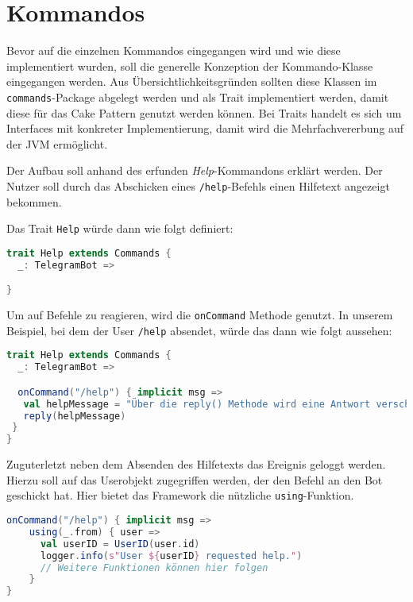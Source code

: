 \section{Kommandos}
Bevor auf die einzelnen Kommandos eingegangen wird und wie diese implementiert wurden, soll die generelle Konzeption der Kommando-Klasse eingegangen werden. Aus Übersichtlichkeitsgründen sollten diese Klassen im \texttt{commands}-Package abgelegt werden und als Trait implementiert werden, damit diese für das Cake Pattern genutzt werden können. Bei Traits handelt es sich um Interfaces mit konkreter Implementierung, damit wird die Mehrfachvererbung auf der JVM ermöglicht.

Der Aufbau soll anhand des erfunden \emph{Help}-Kommandons erklärt werden. Der Nutzer soll durch das Abschicken eines \texttt{/help}-Befehls einen Hilfetext angezeigt bekommen.

Das Trait \texttt{Help} würde dann wie folgt definiert:

\begin{lstlisting}[language=scala,style=scala,caption=Grundstruktur eines eigenen Kommandos]
trait Help extends Commands {
  _: TelegramBot =>

}
\end{lstlisting}

Um auf Befehle zu reagieren, wird die \texttt{onCommand} Methode genutzt. In unserem Beispiel, bei dem der User \texttt{/help} absendet, würde das dann wie folgt aussehen:

\begin{lstlisting}[language=scala, style=scala, caption=Reaktion auf den help-Befehl]
trait Help extends Commands {
  _: TelegramBot =>

  onCommand("/help") { implicit msg =>
   val helpMessage = "Über die reply() Methode wird eine Antwort verschickt."
   reply(helpMessage)
 }
}
\end{lstlisting}

Zuguterletzt neben dem Absenden des Hilfetexts das Ereignis geloggt werden. Hierzu soll auf das Userobjekt zugegriffen werden, der den Befehl an den Bot geschickt hat. Hier bietet das Framework die nützliche \texttt{using}-Funktion.

\begin{lstlisting}[language=scala, style=scala, caption=Zugriff auf das User Objekt]
onCommand("/help") { implicit msg =>
    using(_.from) { user =>
      val userID = UserID(user.id)
      logger.info(s"User ${userID} requested help.")
      // Weitere Funktionen können hier folgen
    }
}
\end{lstlisting}

